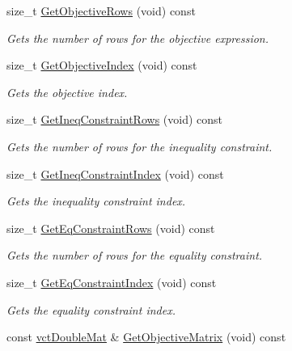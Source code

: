 \begin{DoxyCompactItemize}
size\-\_\-t \hyperlink{classnmr_constraint_optimizer_a4c7b210f3238bd7f2d20abe40ace3898}{Get\-Objective\-Rows} (void) const 
\begin{DoxyCompactList}\small\item\em Gets the number of rows for the objective expression. \end{DoxyCompactList}\item 
size\-\_\-t \hyperlink{classnmr_constraint_optimizer_a99c682a7d2f353bc1943013335ea89fc}{Get\-Objective\-Index} (void) const 
\begin{DoxyCompactList}\small\item\em Gets the objective index. \end{DoxyCompactList}\item 
size\-\_\-t \hyperlink{classnmr_constraint_optimizer_a50363b63412470ee7e1b32af8b2a7946}{Get\-Ineq\-Constraint\-Rows} (void) const 
\begin{DoxyCompactList}\small\item\em Gets the number of rows for the inequality constraint. \end{DoxyCompactList}\item 
size\-\_\-t \hyperlink{classnmr_constraint_optimizer_a192f464d96cc2665b44eb4ba1feadb1b}{Get\-Ineq\-Constraint\-Index} (void) const 
\begin{DoxyCompactList}\small\item\em Gets the inequality constraint index. \end{DoxyCompactList}\item 
size\-\_\-t \hyperlink{classnmr_constraint_optimizer_abe223043a678e4bd88a0c33dd7429a1f}{Get\-Eq\-Constraint\-Rows} (void) const 
\begin{DoxyCompactList}\small\item\em Gets the number of rows for the equality constraint. \end{DoxyCompactList}\item 
size\-\_\-t \hyperlink{classnmr_constraint_optimizer_a7f7971e1b337c9b908dede8f39ff5720}{Get\-Eq\-Constraint\-Index} (void) const 
\begin{DoxyCompactList}\small\item\em Gets the equality constraint index. \end{DoxyCompactList}\item 
const \hyperlink{vct_dynamic_matrix_types_8h_a48f1eb2461d20a99e824ee5753a37c84}{vct\-Double\-Mat} \& \hyperlink{classnmr_constraint_optimizer_a3f488cf21c6f78b7d94915af84432288}{Get\-Objective\-Matrix} (void) const 

\end{DoxyCompactItemize}
